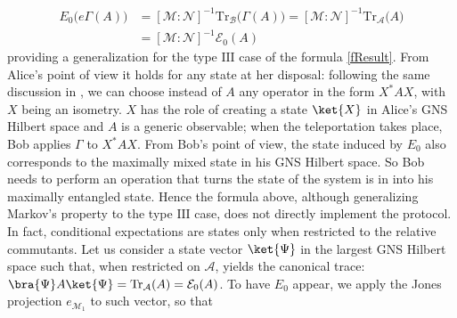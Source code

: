 \documentclass[a4paper,11pt]{article}
\begin{document}
\begin{equation}
    \begin{split}
        E_0 \big( e \Gamma(A) \big) &= [\mathcal{M}:\mathcal{N}]^{-1} \mathrm{Tr}_{\mathcal{B}}\big( \Gamma(A) \big) = [\mathcal{M}:\mathcal{N}]^{-1} \mathrm{Tr}_{\mathcal{A}}\big( A \big) \\
        &= [\mathcal{M}:\mathcal{N}]^{-1} \mathcal{E}_0(A)
    \end{split}
    \label{teleport}
\end{equation}
%
providing a generalization for the type $\mathrm{III}$ case of the formula \ref{fResult}. From Alice's point of view it holds for any state at her disposal: following the same discussion in \cite{Verlinde}, we can choose instead of $A$ any operator in the form $X^* A X$, with $X$ being an isometry. $X$ has the role of creating a state $\ket{X}$ in Alice's GNS Hilbert space and $A$ is a generic observable; when the teleportation takes place, Bob applies $\Gamma$ to $X^* A X$. From Bob's point of view, the state induced by $E_0$ also corresponds to the maximally mixed state in his GNS Hilbert space. So Bob needs to perform an operation that turns the state of the system is in into his maximally entangled state. Hence the formula above, although generalizing Markov's property to the type $\mathrm{III}$ case, does not directly implement the protocol. In fact, conditional expectations are states only when restricted to the relative commutants. Let us consider a state vector $\ket{\Psi}$ in the largest GNS Hilbert space such that, when restricted on $\mathcal{A}$, yields the canonical trace: $\bra{\Psi} A \ket{\Psi} = \mathrm{Tr}_{\mathcal{A}}(A) = \mathcal{E}_0(A)$. To have $E_0$ appear, we apply the Jones projection $e_{\mathcal{M}_1}$ to such vector, so that
\end{document}
